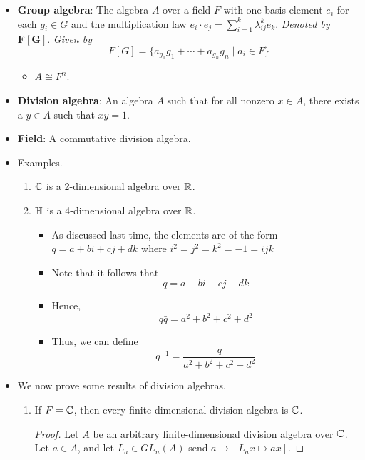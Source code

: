 \documentclass[../notes.tex]{subfiles}
\begin{document}
\begin{itemize}
\begin{proof}
        Understanding this??
    \end{proof}
    \item \textbf{Group algebra}: The algebra $A$ over a field $F$ with one basis element $e_i$ for each $g_i\in G$ and the multiplication law $e_i\cdot e_j=\sum_{i=1}^k\lambda_{ij}^ke_k$. \emph{Denoted by} $\bm{F[G]}$. \emph{Given by}
    \begin{equation*}
        F[G] = \{a_{g_1}g_1+\cdots+a_{g_n}g_n\mid a_i\in F\}
    \end{equation*}
    \begin{itemize}
        \item $A\cong F^n$.
    \end{itemize}
    \item \textbf{Division algebra}: An algebra $A$ such that for all nonzero $x\in A$, there exists a $y\in A$ such that $xy=1$.
    \item \textbf{Field}: A commutative division algebra.
    \item Examples.
    \begin{enumerate}
        \item $\mathbb{C}$ is a 2-dimensional algebra over $\mathbb{R}$.
        \item $\mathbb{H}$ is a 4-dimensional algebra over $\mathbb{R}$.
        \begin{itemize}
            \item As discussed last time, the elements are of the form $q=a+bi+cj+dk$ where $i^2=j^2=k^2=-1=ijk$
            \item Note that it follows that
            \begin{equation*}
                \bar{q} = a-bi-cj-dk
            \end{equation*}
            \item Hence,
            \begin{equation*}
                q\bar{q} = a^2+b^2+c^2+d^2
            \end{equation*}
            \item Thus, we can define
            \begin{equation*}
                q^{-1} = \frac{q}{a^2+b^2+c^2+d^2}
            \end{equation*}
        \end{itemize}
    \end{enumerate}
    \item We now prove some results of division algebras.
    \begin{enumerate}
        \item If $F=\mathbb{C}$, then every finite-dimensional division algebra is $\mathbb{C}$.
        \begin{proof}
            Let $A$ be an arbitrary finite-dimensional division algebra over $\mathbb{C}$. Let $a\in A$, and let $L_a\in GL_n(A)$ send $a\mapsto[L_ax\mapsto ax]$.


\end{proof}
\end{enumerate}
\end{itemize}
\end{document}
